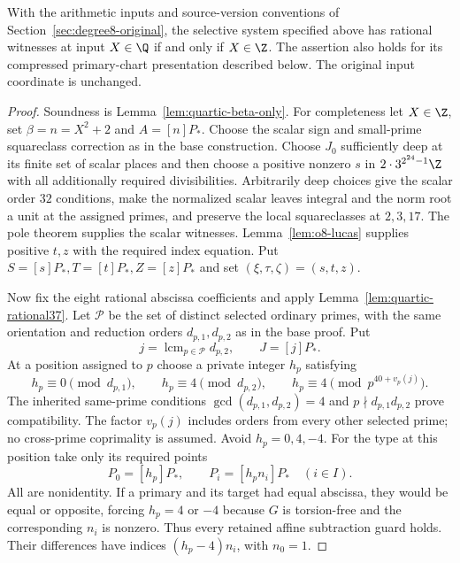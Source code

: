 \begin{theorem}
\label{thm:quartic-source-arithmetic}
With the arithmetic inputs and source-version conventions of
Section~\ref{sec:degree8-original}, the selective system specified
above has rational witnesses at input $X\in\Q$ if and only if $X\in\Z$.
The assertion also holds for its compressed primary-chart presentation
described below. The original input coordinate is unchanged.
\end{theorem}
\begin{proof}
Soundness is Lemma~\ref{lem:quartic-beta-only}.
For completeness let $X\in\Z$, set $\beta=n=X^2+2$ and $A=[n]P_*$.
Choose the scalar sign and small-prime squareclass correction as in the
base construction. Choose $J_0$ sufficiently deep at its finite set of
scalar places and then choose a positive nonzero $s$ in
$2\cdot3^{2^{24}-1}\Z$ with all additionally required divisibilities.
Arbitrarily deep choices give the scalar order $32$ conditions, make the
normalized scalar leaves integral and the norm root a unit at the
assigned primes, and preserve the local squareclasses at $2,3,17$.
The pole theorem supplies the scalar witnesses.
Lemma~\ref{lem:o8-lucas} supplies positive $t,z$ with the required
index equation. Put $S=[s]P_*,T=[t]P_*,Z=[z]P_*$ and set
$(\xi,\tau,\zeta)=(s,t,z)$.

Now fix the eight rational abscissa coefficients and apply
Lemma~\ref{lem:quartic-rational37}. Let $\mathcal P$ be the set of
distinct selected ordinary primes, with the same orientation and
reduction orders $d_{p,1},d_{p,2}$ as in the base proof. Put
\[
 j=\operatorname{lcm}_{p\in\mathcal P}d_{p,2},\qquad J=[j]P_*.
\]
At a position assigned to $p$ choose a private integer $h_p$ satisfying
\[
 h_p\equiv0\pmod {d_{p,1}},\qquad
 h_p\equiv4\pmod {d_{p,2}},\qquad
 h_p\equiv4\pmod {p^{40+v_p(j)}}.
\]
The inherited same-prime conditions
$\gcd(d_{p,1},d_{p,2})=4$ and $p\nmid d_{p,1}d_{p,2}$ prove compatibility.
The factor $v_p(j)$ includes orders from every other selected prime;
no cross-prime coprimality is assumed. Avoid $h_p=0,4,-4$.
For the type at this position take only its required points
\[
 P_0=[h_p]P_*,\qquad P_i=[h_pn_i]P_*\quad(i\in I).
\]
All are nonidentity. If a primary and its target had equal abscissa,
they would be equal or opposite, forcing $h_p=4$ or $-4$ because
$G$ is torsion-free and the corresponding $n_i$ is nonzero. Thus every
retained affine subtraction guard holds. Their differences have indices
$(h_p-4)n_i$, with $n_0=1$.


\end{proof}
